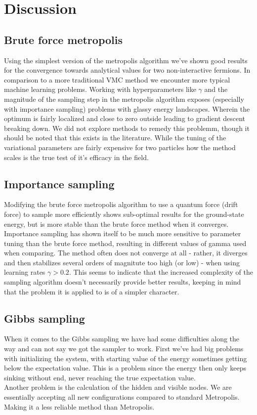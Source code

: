 \section{Discussion}
\subsection{Brute force metropolis}

Using the simplest version of the metropolis algorithm we've shown good results for the convergence towards analytical values for two non-interactive fermions. In comparison to a more traditional VMC method we encounter more typical machine learning problems. Working with hyperparameters like $\gamma$ and the magnitude of the sampling step in the metropolis algorithm exposes (especially with importance sampling) problems with glassy energy landscapes. Wherein the optimum is fairly localized and close to zero outside leading to gradient descent breaking down. We did not explore methods to remedy this problemm, though it should be noted  that this exists in the literature.  While the tuning of the variational parameters are fairly expensive for two particles how the method scales is the  true test of it's efficacy in the field. 

\subsection{Importance sampling}

Modifying the brute force metropolis algorithm to use a quantum force (drift force) to sample more
efficiently shows sub-optimal results for the ground-state energy, but is more stable than the brute
force method when it converges.
Importance sampling has shown itself to be much more sensitive to parameter tuning than the brute
force method, resulting in different values of gamma used when comparing. The method often does not
converge at all - rather, it diverges and then stabilizes several orders of magnitute too high (or low) - when using learning rates $\gamma > 0.2$.
This seems to indicate that the increased complexity of the sampling algorithm doesn't necessarily provide better results, keeping in mind
that the problem it is applied to is of a simpler character.


\subsection{Gibbs sampling}
When it comes to the Gibbs sampling we have had some difficulties along the way and can not say we got the sampler to work.
First we've had big problems with initializing the system, with starting value of the energy sometimes getting below the expectation value. This is a problem since the energy then only keeps sinking without end, never reaching the true expectation value. \\
Another problem is the calculation of the hidden and visible nodes. We are essentially accepting all new configurations compared to standard Metropolis. Making it a less reliable method than Metropolis. 
